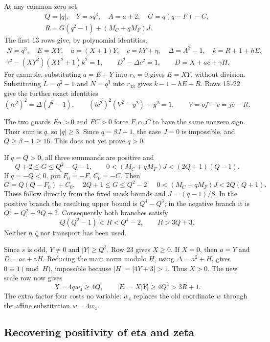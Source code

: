 At any common zero set
\[
 \begin{gathered}
 Q=|q|,\quad Y=sq^3,\quad A=a+2,\quad
 G=q(q-F)-C,\\
 R=G(q^2-1)+(M_C+qM_F)J.
 \end{gathered}
\]
The first 13 rows give, by polynomial identities,
\[
 \begin{gathered}
 N=q^3,\quad E=XY,\quad a=(X+1)Y,\quad c=kY+\eta,\quad
 \Delta=A^2-1,\quad k=R+1+hE,\\
 \tau^2-(XY^2)(XY^2+1)k^2=1,\qquad
 D^2-\Delta c^2=1,\qquad D=X+ac+\gamma H.
 \end{gathered}
\]
For example, substituting \(a=E+Y\) into \(r_5=0\) gives
\(E=XY\), without division.  Substituting \(L=q^2-1\) and
\(N=q^3\) into \(r_{13}\) gives \(k-1-hE-R\).
Rows 15--22 give the further exact identities
\[
 (ic^2)^2=\Delta(f^2-1),\qquad
 (ic^2)^2(V^2-y^2)+y^2=1,\qquad
 V=of-c=jc-R.
\]

The two guards \(F\alpha>0\) and \(FC>0\) force
\(F,\alpha,C\) to have the same nonzero sign.  Their sum is \(q\),
so \(|q|\geq3\).  Since \(q=\beta J+1\), the case \(J=0\) is
impossible, and \(Q\geq\beta-1\geq16\).  This does not yet prove
\(q>0\).

If \(q=Q>0\), all three summands are positive and
\[
 Q+2\leq G\leq Q^2-Q-1,\qquad
 0<(M_C+qM_F)J<(2Q+1)(Q-1).
\]
If \(q=-Q<0\), put \(F_0=-F\), \(C_0=-C\).  Then
\[
 G=Q(Q-F_0)+C_0,\quad 2Q+1\leq G\leq Q^2-2,
 \quad 0<(M_C+qM_F)J<2Q(Q+1).
\]
These follow directly from the fixed mask bounds and
\(J=(q-1)/\beta\).  In the positive branch the resulting upper bound is
\(Q^4-Q^3\); in the negative branch it is
\(Q^4-Q^2+2Q+2\).  Consequently both branches satisfy
\[
 \boxed{\quad Q(Q^2-1)<R<Q^4-2,\qquad R>3Q+3.\quad}
\]
Neither \(\eta,\zeta\) nor transport has been used.

Since \(s\) is odd, \(Y\ne0\) and \(|Y|\geq Q^3\).  Row 23 gives
\(X\geq0\).  If \(X=0\), then \(a=Y\) and
\(D=ac+\gamma H\).  Reducing the main norm modulo \(H\), using
\(\Delta=a^2+H\), gives \(0\equiv1\pmod H\), impossible because
\(|H|=|4Y+3|>1\).  Thus \(X>0\).  The new scale row now gives
\[
 X=4qw_4\geq4Q,\qquad
 |E|=X|Y|\geq4Q^4>3R+1.
\]
The extra factor four costs no variable: \(w_4\) replaces the old
coordinate \(w\) through the affine substitution \(w=4w_4\).

\subsection{Recovering positivity of eta and zeta}

